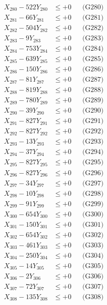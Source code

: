 \documentclass[a4paper,10pt]{article}
\begin{document}
{\begin{align}
X_{280} - 522Y_{280} &\leq +0 && \text{(G280)} \\
\allowbreak
X_{281} - 66Y_{281} &\leq +0 && \text{(G281)} \\
X_{282} - 504Y_{282} &\leq +0 && \text{(G282)} \\
X_{283} - 9Y_{283} &\leq +0 && \text{(G283)} \\
X_{284} - 753Y_{284} &\leq +0 && \text{(G284)} \\
X_{285} - 639Y_{285} &\leq +0 && \text{(G285)} \\
X_{286} - 150Y_{286} &\leq +0 && \text{(G286)} \\
X_{287} - 81Y_{287} &\leq +0 && \text{(G287)} \\
X_{288} - 819Y_{288} &\leq +0 && \text{(G288)} \\
X_{289} - 780Y_{289} &\leq +0 && \text{(G289)} \\
X_{290} - 39Y_{290} &\leq +0 && \text{(G290)} \\
\allowbreak
X_{291} - 827Y_{291} &\leq +0 && \text{(G291)} \\
X_{292} - 827Y_{292} &\leq +0 && \text{(G292)} \\
X_{293} - 13Y_{293} &\leq +0 && \text{(G293)} \\
X_{294} - 37Y_{294} &\leq +0 && \text{(G294)} \\
X_{295} - 827Y_{295} &\leq +0 && \text{(G295)} \\
X_{296} - 827Y_{296} &\leq +0 && \text{(G296)} \\
X_{297} - 34Y_{297} &\leq +0 && \text{(G297)} \\
X_{298} - 10Y_{298} &\leq +0 && \text{(G298)} \\
X_{299} - 91Y_{299} &\leq +0 && \text{(G299)} \\
X_{300} - 654Y_{300} &\leq +0 && \text{(G300)} \\
\allowbreak
X_{301} - 150Y_{301} &\leq +0 && \text{(G301)} \\
X_{302} - 654Y_{302} &\leq +0 && \text{(G302)} \\
X_{303} - 461Y_{303} &\leq +0 && \text{(G303)} \\
X_{304} - 250Y_{304} &\leq +0 && \text{(G304)} \\
X_{305} - 14Y_{305} &\leq +0 && \text{(G305)} \\
X_{306} - 2Y_{306} &\leq +0 && \text{(G306)} \\
X_{307} - 72Y_{307} &\leq +0 && \text{(G307)} \\
X_{308} - 135Y_{308} &\leq +0 && \text{(G308)} \\

\end{align}}
\end{document}
